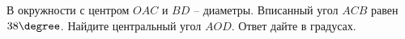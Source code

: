 \begin{ex}
	\begin{condition}
		 В окружности с центром \( O AC \) и \( BD \) – диаметры. Вписанный угол \( ACB \)  равен \( 38 \degree \). Найдите центральный угол \( AOD \). Ответ дайте в градусах.
	\end{condition}
\end{ex}